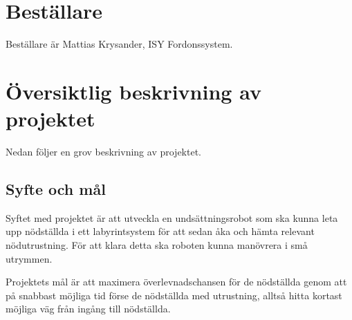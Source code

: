 \documentclass[11pt]{article}
\begin{document}
\begin{flushleft}
\section{Beställare}
Beställare är Mattias Krysander, ISY Fordonssystem.

\section{Översiktlig beskrivning av projektet}
Nedan följer en grov beskrivning av projektet.
\subsection{Syfte och mål}
Syftet med projektet är att utveckla en undsättningsrobot som ska kunna leta upp nödställda i ett labyrintsystem för att sedan åka och hämta relevant nödutrustning. För att klara detta ska roboten kunna manövrera i små utrymmen. 

Projektets mål är att maximera överlevnadschansen för de nödställda genom att på snabbast möjliga tid förse de nödställda med utrustning, alltså hitta kortast möjliga väg från ingång till nödställda.



\end{flushleft}
\end{document}
